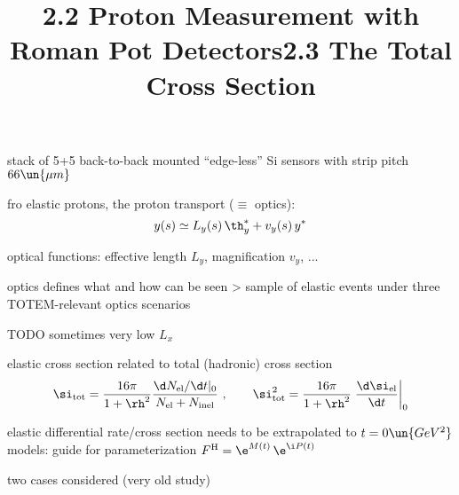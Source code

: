 
\> stack of 5+5 back-to-back mounted ``edge-less'' Si sensors with strip pitch $66\un{\mu m}$


\newpage%
\title{2.2 Proton Measurement with Roman Pot Detectors}


\> fro elastic protons, the proton transport ($\equiv$ optics):
$$y(s) \simeq L_y(s)\, \th_y^* + v_y(s)\, y^*$$

\> optical functions: effective length $L_y$, magnification $v_y$, ...

\> optics defines what and how can be seen
\>> sample of elastic events under three TOTEM-relevant optics scenarios


\> TODO sometimes very low $L_x$


\newpage%
\title{2.3 The Total Cross Section}




\> elastic cross section related to total (hadronic) cross section
$$
	\si_{\rm tot} = {16\pi\over 1+\rh^2} {\d N_{\rm el}/\d t |_0 \over N_{\rm el} + N_{\rm inel}}\ ,\qquad
	\si_{\rm tot}^2 = {16\pi\over 1+\rh^2} \left. {\d\si_{\rm el}\over\d t} \right|_0
$$

\> elastic differential rate/cross section needs to be extrapolated to $t=0\un{GeV^2}$
\> models: guide for parameterization $F^{\rm H} = \e^{M(t)}\, \e^{\i P(t)}$

\> two cases considered (very old study)



